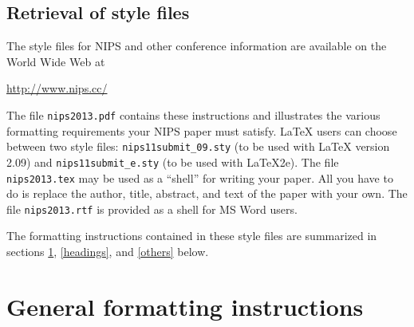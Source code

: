 \documentclass{article} %
\begin{document}
\subsection{Retrieval of style files}

The style files for NIPS and other conference information are available on the World Wide Web at
\begin{center}
   \url{http://www.nips.cc/}
\end{center}
The file \verb+nips2013.pdf+ contains these 
instructions and illustrates the
various formatting requirements your NIPS paper must satisfy. \LaTeX{}
users can choose between two style files:
\verb+nips11submit_09.sty+ (to be used with \LaTeX{} version 2.09) and
\verb+nips11submit_e.sty+ (to be used with \LaTeX{}2e). The file
\verb+nips2013.tex+ may be used as a ``shell'' for writing your paper. All you
have to do is replace the author, title, abstract, and text of the paper with
your own. The file
\verb+nips2013.rtf+ is provided as a shell for MS Word users.

The formatting instructions contained in these style files are summarized in
sections \ref{gen_inst}, \ref{headings}, and \ref{others} below.




\section{General formatting instructions}
\label{gen_inst}
\end{document}
